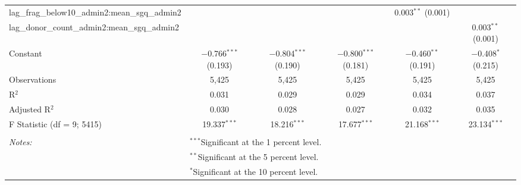 \begin{table}[!htbp]
\begin{tabular}{@{\extracolsep{2pt}}lccccc}
  lag\_frag\_below10\_admin2:mean\_sgq\_admin2 &  &  &  & 0.003$^{**}$ (0.001) &  \\ 
  lag\_donor\_count\_admin2:mean\_sgq\_admin2 &  &  &  &  & 0.003$^{**}$ (0.001) \\ 
  Constant & $-$0.766$^{***}$ (0.193) & $-$0.804$^{***}$ (0.190) & $-$0.800$^{***}$ (0.181) & $-$0.460$^{**}$ (0.191) & $-$0.408$^{*}$ (0.215) \\ 
 Observations & 5,425 & 5,425 & 5,425 & 5,425 & 5,425 \\ 
R$^{2}$ & 0.031 & 0.029 & 0.029 & 0.034 & 0.037 \\ 
Adjusted R$^{2}$ & 0.030 & 0.028 & 0.027 & 0.032 & 0.035 \\ 
F Statistic (df = 9; 5415) & 19.337$^{***}$ & 18.216$^{***}$ & 17.677$^{***}$ & 21.168$^{***}$ & 23.134$^{***}$ \\ 
\hline \\[-1.8ex] 
\textit{Notes:} & \multicolumn{5}{l}{$^{***}$Significant at the 1 percent level.} \\ 
 & \multicolumn{5}{l}{$^{**}$Significant at the 5 percent level.} \\ 
 & \multicolumn{5}{l}{$^{*}$Significant at the 10 percent level.} \\ 
\end{tabular} 
\end{table} 
